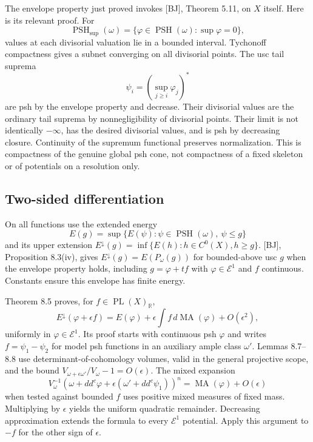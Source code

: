 \documentclass[11pt]{article}
\begin{document}
The envelope property just proved invokes {[}BJ{]}, Theorem 5.11, on
\(X\) itself. Here is its relevant proof. For
\[\operatorname{PSH}_{\sup}(\omega)=\{\varphi\in\operatorname{PSH}(\omega):\sup\varphi=0\},\]
values at each divisorial valuation lie in a bounded interval. Tychonoff
compactness gives a subnet converging on all divisorial points. The usc
tail suprema \[\psi_i=\left(\sup_{j\geq i}\varphi_j\right)^*\] are psh
by the envelope property and decrease. Their divisorial values are the
ordinary tail suprema by nonnegligibility of divisorial points. Their
limit is not identically \(-\infty\), has the desired divisorial values,
and is psh by decreasing closure. Continuity of the supremum functional
preserves normalization. This is compactness of the genuine global psh
cone, not compactness of a fixed skeleton or of potentials on a
resolution only.

\subsection{Two-sided differentiation}\label{two-sided-differentiation}

On all functions use the extended energy
\[E(g)=\sup\{E(\psi):\psi\in\operatorname{PSH}(\omega),\ \psi\leq g\}\]
and its upper extension
\(E^\downarrow(g)=\inf\{E(h):h\in C^0(X),h\geq g\}\). {[}BJ{]},
Proposition 8.3(iv), gives \(E^\downarrow(g)=E(P_\omega(g))\) for
bounded-above usc \(g\) when the envelope property holds, including
\(g=\varphi+tf\) with \(\varphi\in\mathcal E^1\) and \(f\) continuous.
Constants ensure this envelope has finite energy.

Theorem 8.5 proves, for \(f\in\operatorname{PL}(X)_{\mathbb R}\),
\[E^\downarrow(\varphi+\epsilon f)=E(\varphi)+\epsilon\int f\,d\operatorname{MA}(\varphi)+O(\epsilon^2),\]
uniformly in \(\varphi\in\mathcal E^1\). Its proof starts with
continuous psh \(\varphi\) and writes \(f=\psi_1-\psi_2\) for model psh
functions in an auxiliary ample class \(\omega'\). Lemmas 8.7--8.8 use
determinant-of-cohomology volumes, valid in the general projective
scope, and the bound
\(V_{\omega+\epsilon\omega'}/V_\omega-1=O(\epsilon)\). The mixed
expansion
\[V_\omega^{-1}(\omega+dd^c\varphi+\epsilon(\omega'+dd^c\psi_1))^n
=\operatorname{MA}(\varphi)+O(\epsilon)\] when tested against bounded
\(f\) uses positive mixed measures of fixed mass. Multiplying by
\(\epsilon\) yields the uniform quadratic remainder. Decreasing
approximation extends the formula to every \(\mathcal E^1\) potential.
Apply this argument to \(-f\) for the other sign of \(\epsilon\).
\end{document}
